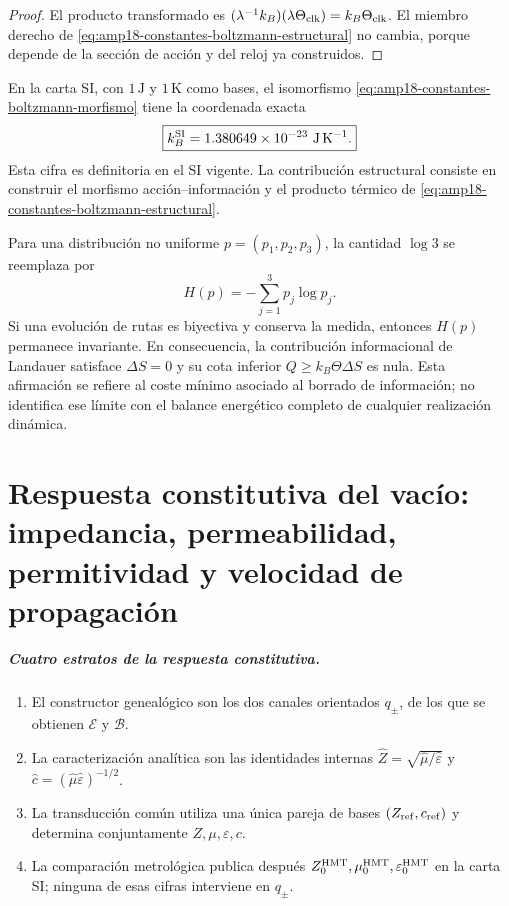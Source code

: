 \begin{proof}
El producto transformado es
\((\lambda^{-1}k_B)(\lambda\Theta_{\rm clk})=
k_B\Theta_{\rm clk}\). El miembro derecho de
\eqref{eq:amp18-constantes-boltzmann-estructural} no cambia, porque depende
de la sección de acción y del reloj ya construidos.
\end{proof}

En la carta SI, con \(1\,\mathrm J\) y \(1\,\mathrm K\) como bases, el
isomorfismo \eqref{eq:amp18-constantes-boltzmann-morfismo} tiene la coordenada
exacta
\begin{equation}
 \label{eq:amp18-constantes-kb-si}
 \boxed{
 k_B^{\rm SI}=1.380649\times10^{-23}\
 \mathrm{J\,K^{-1}}.}
\end{equation}
Esta cifra es definitoria en el SI vigente. La contribución estructural
consiste en construir el morfismo acción--información y el producto térmico
de \eqref{eq:amp18-constantes-boltzmann-estructural}.

Para una distribución no uniforme
\(p=(p_1,p_2,p_3)\), la cantidad \(\log3\) se reemplaza por
\[
 H(p)=-\sum_{j=1}^{3}p_j\log p_j.
\]
Si una evolución de rutas es biyectiva y conserva la medida, entonces
\(H(p)\) permanece invariante. En consecuencia, la contribución informacional
de Landauer satisface \(\Delta S=0\) y su cota inferior
\(Q\geq k_B\Theta\Delta S\) es nula. Esta afirmación se refiere al coste
mínimo asociado al borrado de información; no identifica ese límite con el
balance energético completo de cualquier realización dinámica.

\chapter[Impedancia, permeabilidad y permitividad del vacío]{Respuesta
constitutiva del vacío: impedancia, permeabilidad, permitividad y velocidad de
propagación}

\paragraph{Cuatro estratos de la respuesta constitutiva.}
\begin{enumerate}
 \item El constructor genealógico son los dos canales orientados
 \(q_\pm\), de los que se obtienen \(\mathcal E\) y \(\mathcal B\).
 \item La caracterización analítica son las identidades internas
 \(\widehat Z=\sqrt{\widehat\mu/\widehat\varepsilon}\) y
 \(\widehat c=(\widehat\mu\widehat\varepsilon)^{-1/2}\).
 \item La transducción común utiliza una única pareja de bases
 \((Z_{\rm ref},c_{\rm ref})\) y determina conjuntamente
 \(Z,\mu,\varepsilon,c\).
 \item La comparación metrológica publica después
 \(Z_0^{\rm HMT},\mu_0^{\rm HMT},\varepsilon_0^{\rm HMT}\) en la carta
 SI; ninguna de esas cifras interviene en \(q_\pm\).
\end{enumerate}

